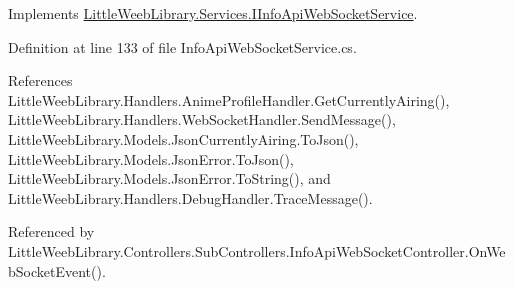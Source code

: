Implements \mbox{\hyperlink{interface_little_weeb_library_1_1_services_1_1_i_info_api_web_socket_service_a1791a3e776fadbc8a72ce23b4d4274b2}{Little\+Weeb\+Library.\+Services.\+I\+Info\+Api\+Web\+Socket\+Service}}.



Definition at line 133 of file Info\+Api\+Web\+Socket\+Service.\+cs.



References Little\+Weeb\+Library.\+Handlers.\+Anime\+Profile\+Handler.\+Get\+Currently\+Airing(), Little\+Weeb\+Library.\+Handlers.\+Web\+Socket\+Handler.\+Send\+Message(), Little\+Weeb\+Library.\+Models.\+Json\+Currently\+Airing.\+To\+Json(), Little\+Weeb\+Library.\+Models.\+Json\+Error.\+To\+Json(), Little\+Weeb\+Library.\+Models.\+Json\+Error.\+To\+String(), and Little\+Weeb\+Library.\+Handlers.\+Debug\+Handler.\+Trace\+Message().



Referenced by Little\+Weeb\+Library.\+Controllers.\+Sub\+Controllers.\+Info\+Api\+Web\+Socket\+Controller.\+On\+Web\+Socket\+Event().


